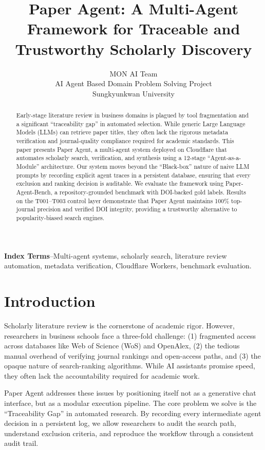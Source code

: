 \documentclass[10pt,twocolumn]{article}
\title{Paper Agent: A Multi-Agent Framework for Traceable and Trustworthy Scholarly Discovery}
\author{MON AI Team\\AI Agent Based Domain Problem Solving Project\\Sungkyunkwan University}
\date{}
\begin{document}
\maketitle

\begin{abstract}
Early-stage literature review in business domains is plagued by tool fragmentation and a significant ``traceability gap'' in automated selection. While generic Large Language Models (LLMs) can retrieve paper titles, they often lack the rigorous metadata verification and journal-quality compliance required for academic standards. This paper presents Paper Agent, a multi-agent system deployed on Cloudflare that automates scholarly search, verification, and synthesis using a 12-stage ``Agent-as-a-Module'' architecture. Our system moves beyond the ``Black-box'' nature of naive LLM prompts by recording explicit agent traces in a persistent database, ensuring that every exclusion and ranking decision is auditable. We evaluate the framework using Paper-Agent-Bench, a repository-grounded benchmark with DOI-backed gold labels. Results on the T001--T003 control layer demonstrate that Paper Agent maintains 100\% top-journal precision and verified DOI integrity, providing a trustworthy alternative to popularity-biased search engines.
\end{abstract}


\noindent\textbf{Index Terms}--Multi-agent systems, scholarly search, literature review automation, metadata verification, Cloudflare Workers, benchmark evaluation.


\section{Introduction}

Scholarly literature review is the cornerstone of academic rigor. However, researchers in business schools face a three-fold challenge: (1) fragmented access across databases like Web of Science (WoS) and OpenAlex, (2) the tedious manual overhead of verifying journal rankings and open-access paths, and (3) the opaque nature of search-ranking algorithms. While AI assistants promise speed, they often lack the accountability required for academic work.

Paper Agent addresses these issues by positioning itself not as a generative chat interface, but as a modular execution pipeline. The core problem we solve is the ``Traceability Gap'' in automated research. By recording every intermediate agent decision in a persistent log, we allow researchers to audit the search path, understand exclusion criteria, and reproduce the workflow through a consistent audit trail.
\end{document}
